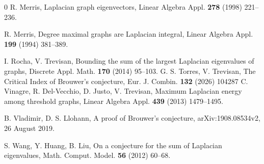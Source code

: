 \documentclass[12pt]{article}
\theoremstyle{plain}
\theoremstyle{definition}
\begin{document}
\begin{thebibliography}{0}
R. Merris, Laplacian graph eigenvectors, Linear Algebra Appl. {\bf 278} (1998) 221–236.

R. Merris, Degree maximal graphs are Laplacian integral, Linear Algebra Appl. {\bf 199} (1994) 381–389.



I. Rocha, V. Trevisan, Bounding the sum of the largest Laplacian eigenvalues of graphs, Discrete Appl. Math. {\bf 170} (2014) 95–103.
G. S. Torres, V. Trevisan, The Critical Index of Brouwer’s conjecture, Eur. J. Combin. {\bf 132} (2026) 104287
C. Vinagre, R. Del-Vecchio, D. Justo, V. Trevisan, Maximum Laplacian energy among threshold graphs, Linear Algebra Appl. {\bf 439} (2013) 1479–1495.

B. Vladimir, D. S. Llohann, A proof of Brouwer’s conjecture, arXiv:1908.08534v2, 26 August 2019.

S. Wang, Y. Huang, B. Liu, On a conjecture for the sum of Laplacian eigenvalues, Math. Comput. Model. {\bf 56} (2012) 60–68.
\end{thebibliography}
\end{document}
